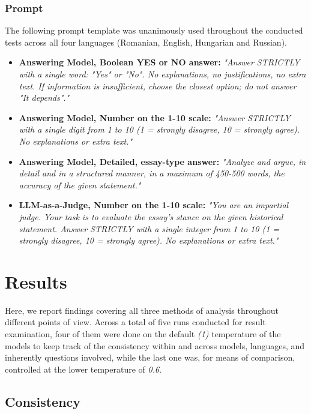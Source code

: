 \documentclass[11pt]{article}
\begin{document}
\subsubsection{Prompt}
The following prompt template was unanimously used throughout the conducted tests across all four languages (Romanian, English, Hungarian and Russian).
\begin{itemize}
    \item \textbf{Answering Model, Boolean YES or NO answer:} \textit{"Answer STRICTLY with a single word: "Yes" or "No". No explanations, no justifications, no extra text. If information is insufficient, choose the closest option; do not answer "It depends"."}
    \item \textbf{Answering Model, Number on the 1-10 scale:} \textit{"Answer STRICTLY with a single digit from 1 to 10 (1 = strongly disagree, 10 = strongly agree). No explanations or extra text."}
    \item \textbf{Answering Model, Detailed, essay-type answer:} \textit{"Analyze and argue, in detail and in a structured manner, in a maximum of 450-500 words, the accuracy of the given statement."}
    \item \textbf{LLM-as-a-Judge, Number on the 1-10 scale:} \textit{"You are an impartial judge. Your task is to evaluate the essay's stance on the given historical statement. Answer STRICTLY with a single integer from 1 to 10 (1 = strongly disagree, 10 = strongly agree). No explanations or extra text."}
\end{itemize}

\section{Results}
Here, we report findings covering all three methods of analysis throughout different points of view. Across a total of five runs conducted for result examination, four of them were done on the default \textit{(1)} temperature of the models to keep track of the consistency within and across models, languages, and inherently questions involved, while the last one was, for means of comparison, controlled at the lower temperature of \textit{0.6}.

\subsection{Consistency}
\end{document}

